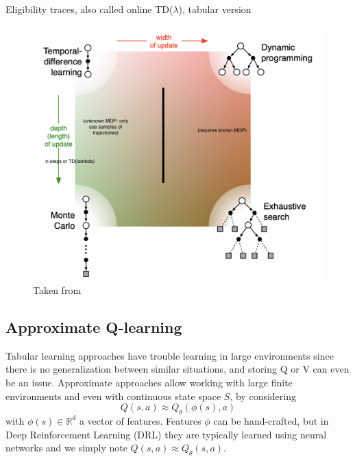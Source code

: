 \begin{algorithm}[H]
\DontPrintSemicolon
{}
\caption{Eligibility traces, also called online TD($\lambda$), tabular version}
\label{algo:eligibility-traces}
\end{algorithm}


\begin{figure}[H]
    \centering
    \includegraphics[width=0.5\linewidth]{figures/td-learning.png}
    \caption{Taken from \cite{sutton2018reinforcement}}
    \label{fig:td-learning}
\end{figure}


\subsection{Approximate Q-learning}
Tabular learning approaches have trouble learning in large environments since there is no generalization between similar situations, and storing Q or V can even be an issue. Approximate approaches allow working with large finite environments and even with continuous state space $S$, by considering
\[
    Q(s,a) \approx Q_\theta(\phi(s),a)
\]
with $\phi(s) \in \mathbb{R}^d$ a vector of features. Features $\phi$ can be hand-crafted, but in Deep Reinforcement Learning (DRL) they are typically learned using neural networks and we simply note $Q(s,a) \approx Q_\theta(s,a)$.

